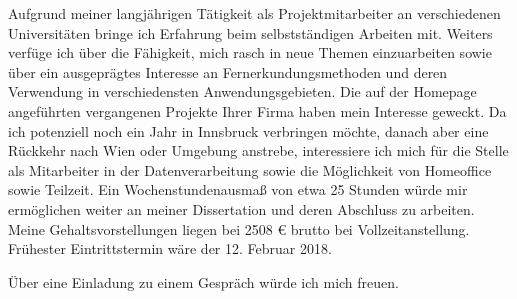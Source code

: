 \documentclass[11pt,a4paper,sans]{moderncv}        %
\begin{document}
Aufgrund meiner langj\"{a}hrigen T\"atigkeit als Projektmitarbeiter an verschiedenen Universit\"{a}ten bringe ich Erfahrung beim selbstst\"{a}ndigen Arbeiten mit. Weiters verf\"uge ich \"uber die F\"{a}higkeit, mich rasch in neue Themen einzuarbeiten sowie \"uber ein ausgepr\"{a}gtes Interesse an Fernerkundungsmethoden und deren Verwendung in verschiedensten Anwendungsgebieten. Die auf der Homepage angef\"{u}hrten vergangenen Projekte Ihrer Firma haben mein Interesse geweckt. Da ich potenziell noch ein Jahr in Innsbruck verbringen m\"ochte, danach aber eine R\"uckkehr nach Wien oder Umgebung anstrebe, interessiere ich mich f\"{u}r die Stelle als Mitarbeiter in der Datenverarbeitung sowie die M\"{o}glichkeit von Homeoffice sowie Teilzeit. Ein Wochenstundenausma{\ss} von etwa 25 Stunden w\"urde mir erm\"oglichen weiter an meiner Dissertation und deren Abschluss zu arbeiten. Meine Gehaltsvorstellungen liegen bei 2508 \euro{} brutto  bei Vollzeitanstellung. Fr\"uhester Eintrittstermin w\"are der 12. Februar 2018.

\"{U}ber eine Einladung zu einem Gespr\"ach w\"urde ich mich freuen.

\makeletterclosing
\clearpage
\makecvtitle
\end{document}
